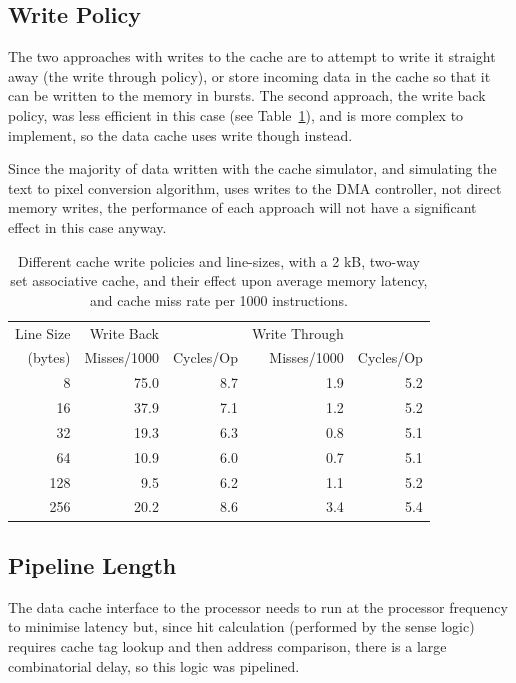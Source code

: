\subsection{Write Policy}
The two approaches with writes to the cache are to attempt to write it straight
away (the write through policy), or store incoming data in the cache so that it
can be written to the memory in bursts. The second approach, the write back
policy, was less efficient in this case (see Table~\ref{Write_Policy}), and is
more complex to implement, so the data cache uses write though instead.

Since the majority of data written with the cache simulator, and simulating the
text to pixel conversion algorithm, uses writes to the DMA controller, not direct
memory writes, the performance of each approach will not have a significant
effect in this case anyway.

\begin{table}[h]
\begin{center}
\begin{tabular}{r | r r | r r }
Line Size & Write Back & & Write Through & \\
(bytes) & Misses/1000 & Cycles/Op & Misses/1000 & Cycles/Op \\
\hline
8   &  75.0 &  8.7 & 1.9 & 5.2 \\
16  &  37.9 &  7.1 & 1.2 & 5.2 \\
32  &  19.3 &  6.3 & 0.8 & 5.1 \\
64  &  10.9 &  6.0 & 0.7 & 5.1 \\
128 &   9.5 &  6.2 & 1.1 & 5.2 \\
256 &  20.2 &  8.6 & 3.4 & 5.4 \\
\end{tabular}
\caption[Cache Write Policies vs. Performance]{Different cache write policies
and line-sizes, with a 2 kB, two-way set associative cache, and their effect
upon average memory latency, and cache miss rate per 1000 instructions.}
\label{Write_Policy}
\end{center}
\end{table}


\subsection{Pipeline Length}
\label{CACHE_Pipeline}
The data cache interface to the processor needs to run at the processor frequency
to minimise latency but, since hit calculation (performed by the sense logic)
requires cache tag lookup and then address comparison, there is a large
combinatorial delay, so this logic was pipelined.

